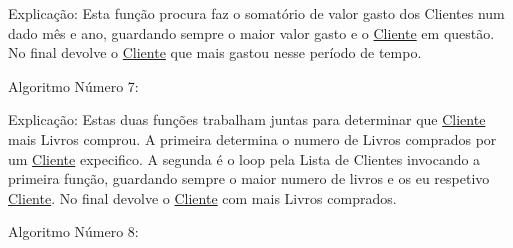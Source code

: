 \begin{DoxyEnumerate}
\begin{DoxyCode}{0}
\DoxyCodeLine{\}}
\end{DoxyCode}
 Explicação\+: Esta função procura faz o somatório de valor gasto dos Clientes num dado mês e ano, guardando sempre o maior valor gasto e o \mbox{\hyperlink{structCliente}{Cliente}} em questão. No final devolve o \mbox{\hyperlink{structCliente}{Cliente}} que mais gastou nesse período de tempo.
\item Algoritmo Número 7\+: 
\begin{DoxyCode}{0}
\DoxyCodeLine{}
\DoxyCodeLine{    \}}
\DoxyCodeLine{    }
\DoxyCodeLine{\}}
\DoxyCodeLine{}
\DoxyCodeLine{}
\DoxyCodeLine{        \}}
\DoxyCodeLine{}
\DoxyCodeLine{    \}}
\DoxyCodeLine{\}}
\end{DoxyCode}
 Explicação\+: Estas duas funções trabalham juntas para determinar que \mbox{\hyperlink{structCliente}{Cliente}} mais Livros comprou. A primeira determina o numero de Livros comprados por um \mbox{\hyperlink{structCliente}{Cliente}} expecifico. A segunda é o loop pela Lista de Clientes invocando a primeira função, guardando sempre o maior numero de livros e os eu respetivo \mbox{\hyperlink{structCliente}{Cliente}}. No final devolve o \mbox{\hyperlink{structCliente}{Cliente}} com mais Livros comprados.
\item Algoritmo Número 8\+: 
\begin{DoxyCode}{0}
\DoxyCodeLine{    \}}
\DoxyCodeLine{}
\DoxyCodeLine{    \}}
\DoxyCodeLine{}
\DoxyCodeLine{\}}

\end{DoxyCode}
\end{DoxyEnumerate}
